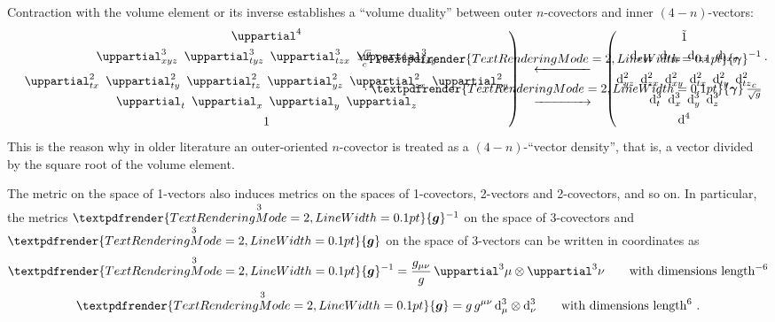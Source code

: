 \documentclass[\ifafour a4paper,12pt,\else a5paper,10pt,\fi%
onecolumn,oneside,article,%
british%
]{memoir}
\theoremstyle{remark}
\theoremstyle{innote}
\renewcommand*{\bm}[1]{\textpdfrender{TextRenderingMode=2,LineWidth=0.1pt}{\boldsymbol{#1}}}
\newcommand*{\de}{\uppartial}%
\newcommand*{\di}{\mathrm{d}}%
\renewcommand*{\|}[1][]{\nonscript\:#1\vert\nonscript\:\mathopen{}}
\newcommand*{\se}[1]{\de_{#1}}
\newcommand*{\sse}[1]{\de^{2}_{#1}}
\newcommand*{\ssse}[1]{\de^{3}_{#1}}
\newcommand*{\sssse}[1]{\de^{4}_{#1}}
\newcommand*{\tw}[1]{\tilde{#1}}
\newcommand*{\ttte}[1]{\de^{3}{#1}}
\newcommand*{\ti}[1]{\di_{#1}}
\newcommand*{\tti}[1]{\di^{2}_{#1}}
\newcommand*{\ttti}[1]{\di^{3}_{#1}}
\newcommand*{\tttti}[1]{\di^{4}_{#1}}
\newcommand*{\ygg}[1][]{\overset{#1}{\bm{g}}{}}
\newcommand*{\dg}{\sqrt{g}}
\newcommand*{\ve}{\bm{\gamma}}
\newcommand*{\vi}{\bm{\gamma}^{-1}}
\begin{document}
Contraction with the volume element or its inverse establishes a \enquote{volume duality} between outer $n$-covectors and inner $(4-n)$-vectors:
\begin{equation}
  \label{eq:volume_duality}
  \left.
    \begin{gathered}
      \sssse{}
      \\
  \ssse{xyz}\enspace
  \ssse{tyz}\enspace
  \ssse{tzx}\enspace
  \ssse{txy}
  \\[\jot]
  \sse{tx}\enspace
  \sse{ty}\enspace
  \sse{tz}\enspace
  \sse{yz}\enspace
  \sse{zx}\enspace
  \sse{xy}
  \\
  \se{t}\enspace
  \se{x}\enspace
  \se{y}\enspace
  \se{z}
  \\
  1
\end{gathered}
\right)\quad
\begin{gathered}
  \xleftarrow{\qquad\mathclap{\textstyle\frac{\dg}{c}\,\vi\cdot{}}\qquad}
  \\
  \xrightarrow{\qquad\mathclap{\textstyle{}\cdot\ve\,\frac{c}{\dg}}\qquad}
\end{gathered}
\quad%
\left(
  \begin{gathered}
    \tw{1}
    \\
  \ti{xyz}\enspace
  \ti{tyz}\enspace
  \ti{tzx}\enspace
  \ti{txy}
  \\[\jot]
  \tti{yz}\enspace
  \tti{zx}\enspace
  \tti{xy}\enspace
  \tti{tx}\enspace
  \tti{ty}\enspace
  \tti{tz}
  \\
  \ttti{t}\enspace
  \ttti{x}\enspace
  \ttti{y}\enspace
  \ttti{z}
  \\
  \tttti{}
\end{gathered}
\right.
\end{equation}
This is the reason why in older literature an outer-oriented $n$-covector is treated as a $(4-n)$-\enquote{vector density}, that is, a vector divided by the square root of the volume element.

\medskip

The metric on the space of 1-vectors also induces metrics on the spaces of 1-covectors, 2-vectors and 2-covectors, and so on. In particular, the metrics $\ygg[3]^{-1}$ on the space of 3-covectors and $\ygg[3]$ on the space of 3-vectors can be written in coordinates as
\begin{gather}
  \label{eq:3-covvect_metrics}
  \ygg[3]^{-1} = \frac{g_{\mu\nu}}{g}\,\ttte{\mu}\otimes\ttte{\nu}
  \qquad\text{with dimensions length${}^{-6}$}
  \\
  \label{eq:3-vect_metrics}
  \ygg[3] = g\,g^{\mu\nu}\,\ttti{\mu}\otimes\ttti{\nu}
  \qquad\text{with dimensions length${}^{6}$} \ .
\end{gather}
\end{document}
